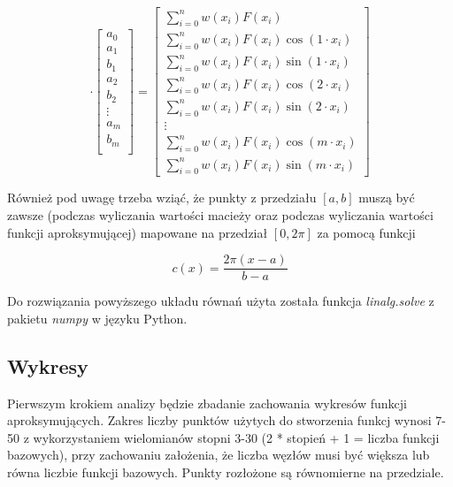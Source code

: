 \documentclass{article}
\begin{document}
\[
\cdot
\begin{bmatrix}
    a_0 \\
    a_1 \\
    b_1 \\
    a_2 \\
    b_2 \\
    \vdots \\
    a_m \\
    b_m \\ 
\end{bmatrix}
=
\begin{bmatrix}
    \sum_{i=0}^nw(x_i)F(x_i) \\
    \sum_{i=0}^nw(x_i)F(x_i)\cos(1\cdot x_i) \\
    \sum_{i=0}^nw(x_i)F(x_i)\sin(1\cdot x_i) \\
    \sum_{i=0}^nw(x_i)F(x_i)\cos(2\cdot x_i) \\
    \sum_{i=0}^nw(x_i)F(x_i)\sin(2\cdot x_i) \\
    \vdots \\
    \sum_{i=0}^nw(x_i)F(x_i)\cos(m\cdot x_i) \\ 
    \sum_{i=0}^nw(x_i)F(x_i)\sin(m\cdot x_i)
\end{bmatrix}    
\]

Również pod uwagę trzeba wziąć, że punkty z przedziału $[a,b]$ muszą być zawsze (podczas wyliczania wartości macieży oraz podczas wyliczania wartości
funkcji aproksymującej) mapowane na przedział $[0, 2\pi]$ za pomocą funkcji

$$c(x)=\frac{2\pi (x-a)}{b-a}$$

Do rozwiązania powyższego układu równań użyta została funkcja \textit{linalg.solve} z pakietu \textit{numpy}
w języku Python.

\subsection{Wykresy}
Pierwszym krokiem analizy będzie zbadanie zachowania wykresów funkcji aproksymujących. Zakres liczby punktów użytych do
stworzenia funkcj wynosi 7-50 z wykorzystaniem wielomianów stopni 3-30 (2 * stopień + 1 = liczba funkcji bazowych), przy 
zachowaniu założenia, że liczba węzłów musi być większa lub równa liczbie funkcji bazowych. Punkty rozłożone są
równomierne na przedziale.
\end{document}

